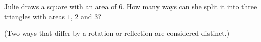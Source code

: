 Julie draws a square with an area of $6$. How many ways can she split it into three triangles with areas $1$, $2$ and $3$?

(Two ways that differ by a rotation or reflection are considered distinct.)
